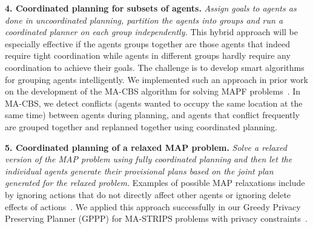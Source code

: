 \documentclass[11pt]{article}
\begin{document}

{\bf 4. Coordinated planning for subsets of agents.} {\em Assign goals to agents as done in uncoordinated planning, partition the agents into groups and run a coordinated planner on each group independently.} This hybrid approach will be especially effective if the agents groups together are those agents that indeed require tight coordination while agents in different groups hardly require any coordination to achieve their goals. 
The challenge is to develop smart algorithms for grouping agents intelligently. We implemented such an approach in prior work on the development of the MA-CBS algorithm for solving MAPF problems~\cite{sharon2015conflict-based}. In MA-CBS, we detect conflicts (agents wanted to occupy the same location at the same time) between agents during planning, and agents that conflict frequently are grouped together and replanned together using coordinated planning. 


{\bf 5. Coordinated planning of a relaxed MAP problem.} {\em Solve a relaxed version of the MAP problem using fully coordinated planning and then let the individual agents generate their provisional plans based on the joint plan generated for the relaxed problem.} Examples of possible MAP relaxations include by ignoring actions that do not directly affect other agents or ignoring delete effects of actions~\cite{hoffmann2005ignoring,domshlak2015red,vstolba2014relaxation}. We applied this approach successfully in our Greedy Privacy Preserving Planner (GPPP) for MA-STRIPS problems with privacy constraints~\cite{maliah2014privacyPreserving,maliah2015privacy}. 
\end{document}
